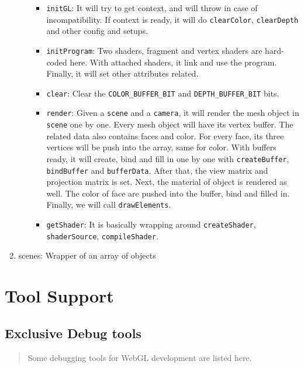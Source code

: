 \documentclass[]{article}
\begin{document}
\begin{enumerate}
\begin{enumerate}
    \begin{itemize}
    \itemsep1pt\parskip0pt
    \item
      \texttt{initGL}: It will try to get context, and will throw in
      case of incompatibility. If context is ready, it will do
      \texttt{clearColor}, \texttt{clearDepth} and other config and
      setups.
    \item
      \texttt{initProgram}: Two shaders, fragment and vertex shaders are
      hard-coded here. With attached shaders, it link and use the
      program. Finally, it will set other attributes related.
    \item
      \texttt{clear}: Clear the \texttt{COLOR\_BUFFER\_BIT} and
      \texttt{DEPTH\_BUFFER\_BIT} bits.
    \item
      \texttt{render}: Given a \texttt{scene} and a \texttt{camera}, it
      will render the mesh object in \texttt{scene} one by one. Every
      mesh object will have its vertex buffer. The related data also
      contains faces and color. For every face, its three vertices will
      be push into the array, same for color. With buffers ready, it
      will create, bind and fill in one by one with
      \texttt{createBuffer}, \texttt{bindBuffer} and
      \texttt{bufferData}. After that, the view matrix and projection
      matrix is set. Next, the material of object is rendered as well.
      The color of face are pushed into the buffer, bind and filled in.
      Finally, we will call \texttt{drawElements}.
    \item
      \texttt{getShader}: It is basically wrapping around
      \texttt{createShader}, \texttt{shaderSource},
      \texttt{compileShader}.
    \end{itemize}
  \end{enumerate}
\item
  scenes: Wrapper of an array of objects
\end{enumerate}

\newpage
\section{Tool Support}\label{tool-support}

\subsection{Exclusive Debug tools}\label{exclusive-debug-tools}

\begin{quote}
Some debugging tools for WebGL development are listed here.
\end{quote}
\end{document}
